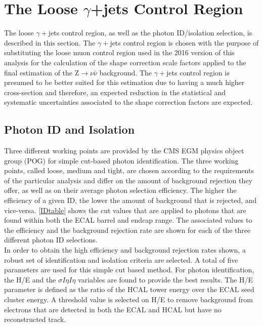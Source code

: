 \section{The Loose $\gamma$+jets Control Region}

The loose $\gamma+$jets control region, as well as the photon ID/isolation selection, is described in this section. The $\gamma+$jets control region is chosen with the purpose of substituting the loose muon control region used in the 2016 version of this analysis for the calculation of the shape correction scale factors applied to the final estimation of the Z$\rightarrow\nu\bar{\nu}$ background. The $\gamma+$jets control region is presumed to be better suited for this estimation due to having a much higher cross-section and therefore, an expected reduction in the statistical and systematic uncertainties associated to the shape correction factors are expected.

\subsection{Photon ID and Isolation}\label{photonID}

Three different working points are provided by the CMS EGM physics object group (POG) for simple cut-based photon identification\cite{photonID}. The three working points, called loose, medium and tight, are chosen according to the requirements of the particular analysis and differ on the amount of background rejection they offer, as well as on their average photon selection efficiency. The higher the efficiency of a given ID, the lower the amount of background that is rejected, and vice-versa. \autoref{IDtable} shows the cut values that are applied to photons that are found within both the ECAL barrel and endcap range. The associated values to the efficiency and the background rejection rate are shown for each of the three different photon ID selections.\\

In order to obtain the high efficiency and background rejection rates shown, a robust set of identification and isolation criteria are selected. A total of five parameters are used for this simple cut based method. For photon identification, the H/E and the $\sigma I\eta I\eta$ variables are found to provide the best results. The H/E parameter is defined as the ratio of the HCAL tower energy over the ECAL seed cluster energy. A threshold value is selected on H/E to remove background from electrons that are detected in both the ECAL and HCAL but have no reconstructed track\cite{egamma}.

